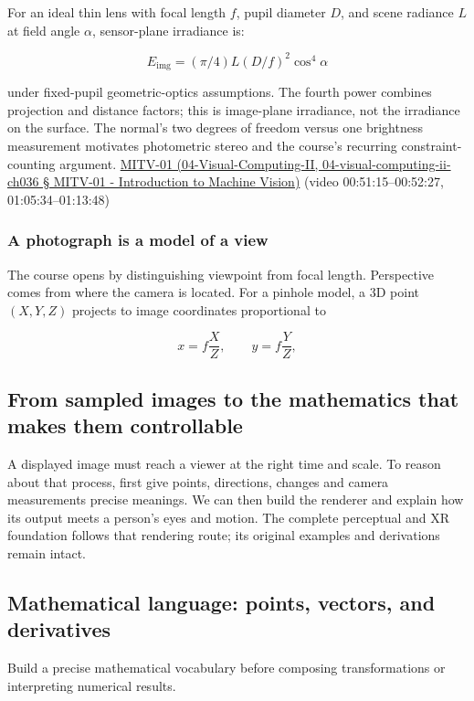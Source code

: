 For an ideal thin lens with focal length \(f\), pupil diameter \(D\), and scene radiance \(L\) at field angle \(\alpha\), sensor-plane irradiance is:

\[E_{\mathrm{img}}=(\pi/4)L(D/f)^2\cos^4\alpha\]

under fixed-pupil geometric-optics assumptions. The fourth power combines projection and distance factors; this is image-plane irradiance, not the irradiance on the surface. The normal's two degrees of freedom versus one brightness measurement motivates photometric stereo and the course's recurring constraint-counting argument. \href{}{MITV-01 (04-Visual-Computing-II, 04-visual-computing-ii-ch036 § MITV-01 - Introduction to Machine Vision)} (video 00:51:15--00:52:27, 01:05:34--01:13:48)

\subsubsection{A photograph is a model of a view}\label{a-photograph-is-a-model-of-a-view}

The course opens by distinguishing viewpoint from focal length. Perspective comes from where the camera is located. For a pinhole model, a 3D point \((X,Y,Z)\) projects to image coordinates proportional to

\[
x=f\frac{X}{Z},\qquad y=f\frac{Y}{Z},
\]

\subsection{From sampled images to the mathematics that makes them controllable}\label{from-sampled-images-to-the-mathematics-that-makes-them-controllable}

A displayed image must reach a viewer at the right time and scale. To reason about that process, first give points, directions, changes and camera measurements precise meanings. We can then build the renderer and explain how its output meets a person's eyes and motion. The complete perceptual and XR foundation follows that rendering route; its original examples and derivations remain intact.

\subsection{Mathematical language: points, vectors, and derivatives}\label{mathematical-language-points-vectors-and-derivatives}

Build a precise mathematical vocabulary before composing transformations or interpreting numerical results.

